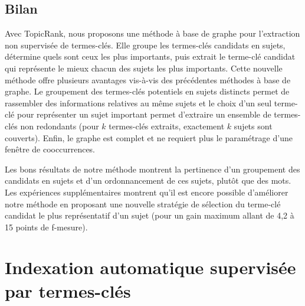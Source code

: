       \subsection{Bilan}
      \label{subsec:main-automatic_keyphrase_annotation-unsupervised_automatic_keyphrase_extraction-bilan}
        Avec TopicRank, nous proposons une méthode à base de graphe pour
        l'extraction non supervisée de termes-clés. Elle groupe les termes-clés
        candidats en sujets, détermine quels sont ceux les plus importants, puis
        extrait le terme-clé candidat qui représente le mieux chacun des sujets
        les plus importants. Cette nouvelle méthode offre plusieurs avantages
        vis-à-vis des précédentes méthodes à base de graphe. Le groupement des
        termes-clés potentiels en sujets distincts permet de rassembler des
        informations relatives au même sujets et le choix d'un seul terme-clé
        pour représenter un sujet important permet d'extraire un ensemble de
        termes-clés non redondants (pour $k$ termes-clés extraits, exactement
        $k$ sujets sont couverts). Enfin, le graphe est complet et ne requiert
        plus le paramétrage d'une fenêtre de cooccurrences.

        Les bons résultats de notre méthode montrent la pertinence d'un
        groupement des candidats en sujets et d'un ordonnancement de ces sujets,
        plutôt que des mots. Les expériences supplémentaires montrent qu'il est
        encore possible d'améliorer notre méthode en proposant une nouvelle
        stratégie de sélection du terme-clé candidat le plus représentatif d'un
        sujet (pour un gain maximum allant de 4,2 à 15 points de f-mesure).


  \section{Indexation automatique supervisée par termes-clés}
  \label{sec:main-automatic_keyphrase_annotation-supervised_automatic_keyphrase_extraction}



